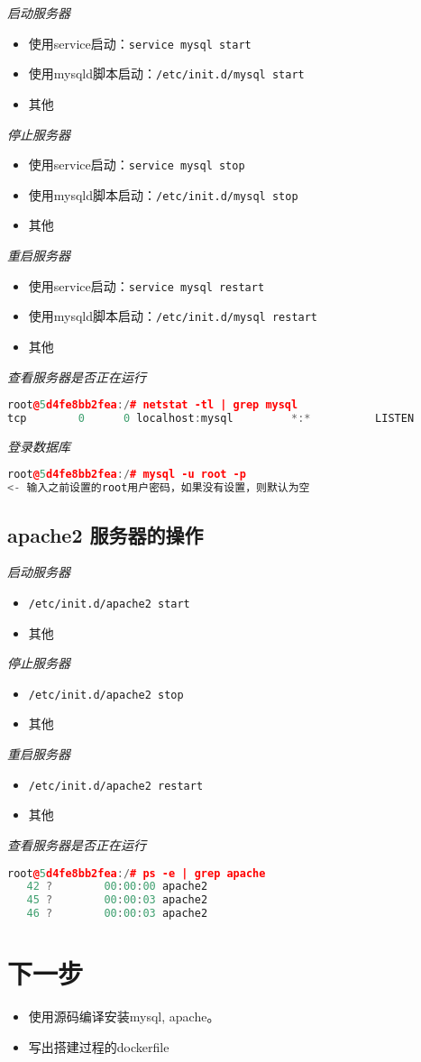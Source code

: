 \documentclass[a4]{article}
\begin{document}
\label{q:mysql-control}
\emph{启动服务器}
\begin{itemize}
    \item 使用service启动：\lstinline{service mysql start}
    \item 使用mysqld脚本启动：\lstinline{/etc/init.d/mysql start}
    \item 其他
\end{itemize}
\emph{停止服务器}
\begin{itemize}
    \item 使用service启动：\lstinline{service mysql stop}
    \item 使用mysqld脚本启动：\lstinline{/etc/init.d/mysql stop}
    \item 其他
\end{itemize}
\emph{重启服务器}
\begin{itemize}
    \item 使用service启动：\lstinline{service mysql restart}
    \item 使用mysqld脚本启动：\lstinline{/etc/init.d/mysql restart}
    \item 其他
\end{itemize}
\emph{查看服务器是否正在运行}
\begin{lstlisting}[language=C++]
root@5d4fe8bb2fea:/# netstat -tl | grep mysql
tcp        0      0 localhost:mysql         *:*          LISTEN     
\end{lstlisting}
\emph{登录数据库}
\begin{lstlisting}[language=C++]
root@5d4fe8bb2fea:/# mysql -u root -p 
<- 输入之前设置的root用户密码，如果没有设置，则默认为空
\end{lstlisting}

\subsection{apache2 服务器的操作} 

\label{q:apache-control}
\emph{启动服务器}
\begin{itemize}
    \item \lstinline{/etc/init.d/apache2 start}
    \item 其他
\end{itemize}
\emph{停止服务器}
\begin{itemize}
    \item \lstinline{/etc/init.d/apache2 stop}
    \item 其他
\end{itemize}
\emph{重启服务器}
\begin{itemize}
    \item \lstinline{/etc/init.d/apache2 restart}
    \item 其他
\end{itemize}
\emph{查看服务器是否正在运行}
\begin{lstlisting}[language=C++]
root@5d4fe8bb2fea:/# ps -e | grep apache
   42 ?        00:00:00 apache2
   45 ?        00:00:03 apache2
   46 ?        00:00:03 apache2
\end{lstlisting}

\section{下一步}
\begin{itemize}
    \item 使用源码编译安装mysql, apache。
    \item 写出搭建过程的dockerfile
\end{itemize}
\end{document}

